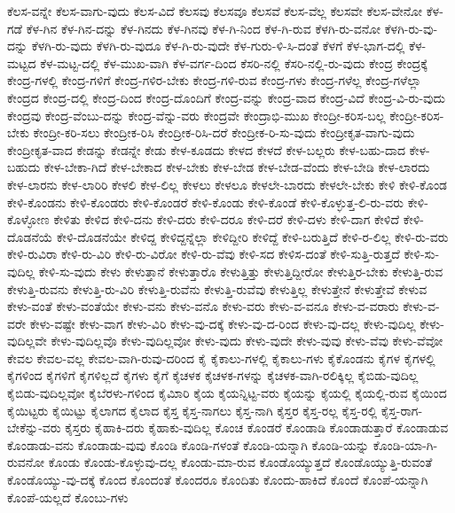 {ಕೆಲಸ-ವನ್ನೇ
ಕೆಲಸ-ವಾಗು-ವುದು
ಕೆಲಸ-ವಿದೆ
ಕೆಲಸವು
ಕೆಲಸವೂ
ಕೆಲಸವೆ
ಕೆಲಸ-ವೆಲ್ಲ
ಕೆಲಸವೇ
ಕೆಲಸ-ವೇನೋ
ಕೆಳ-ಗಡೆ
ಕೆಳ-ಗಿನ
ಕೆಳ-ಗಿನ-ದನ್ನು
ಕೆಳ-ಗಿನದು
ಕೆಳ-ಗಿನವು
ಕೆಳ-ಗಿ-ನಿಂದ
ಕೆಳ-ಗಿ-ರುವ
ಕೆಳಗಿ-ರು-ವನೋ
ಕೆಳಗಿ-ರು-ವು-ದನ್ನು
ಕೆಳಗಿ-ರು-ವುದು
ಕೆಳಗಿ-ರು-ವುದೂ
ಕೆಳ-ಗಿ-ರು-ವುದೇ
ಕೆಳ-ಗುರು-ಳಿ-ಸಿ-ದಂತೆ
ಕೆಳಗೆ
ಕೆಳ-ಭಾಗ-ದಲ್ಲಿ
ಕೆಳ-ಮಟ್ಟದ
ಕೆಳ-ಮಟ್ಟ-ದಲ್ಲಿ
ಕೆಳ-ಮುಖ-ವಾಗಿ
ಕೆಳ-ವರ್ಗ-ದಿಂದ
ಕೆಸರಿ-ನಲ್ಲಿ
ಕೆಸರಿ-ನಲ್ಲಿ-ರು-ವುದು
ಕೇಂದ್ರ
ಕೇಂದ್ರಕ್ಕೆ
ಕೇಂದ್ರ-ಗಳಲ್ಲಿ
ಕೇಂದ್ರ-ಗಳಿಗೆ
ಕೇಂದ್ರ-ಗಳಿರ-ಬೇಕು
ಕೇಂದ್ರ-ಗಳಿ-ರುವ
ಕೇಂದ್ರ-ಗಳು
ಕೇಂದ್ರ-ಗಳೆಲ್ಲ
ಕೇಂದ್ರ-ಗಳೆಲ್ಲಾ
ಕೇಂದ್ರದ
ಕೇಂದ್ರ-ದಲ್ಲಿ
ಕೇಂದ್ರ-ದಿಂದ
ಕೇಂದ್ರ-ದೊಂದಿಗೆ
ಕೇಂದ್ರ-ವನ್ನು
ಕೇಂದ್ರ-ವಾದ
ಕೇಂದ್ರ-ವಿದೆ
ಕೇಂದ್ರ-ವಿ-ರು-ವುದು
ಕೇಂದ್ರವು
ಕೇಂದ್ರ-ವೆಂಬು-ದನ್ನು
ಕೇಂದ್ರ-ವೆನ್ನು-ವರು
ಕೇಂದ್ರವೇ
ಕೇಂದ್ರಾಭಿ-ಮುಖ
ಕೇಂದ್ರೀ-ಕರಿಸ-ಬಲ್ಲ
ಕೇಂದ್ರೀ-ಕರಿಸ-ಬೇಕು
ಕೇಂದ್ರೀ-ಕರಿ-ಸಲು
ಕೇಂದ್ರೀಕ-ರಿಸಿ
ಕೇಂದ್ರೀಕ-ರಿಸಿ-ದರೆ
ಕೇಂದ್ರೀಕ-ರಿ-ಸು-ವುದು
ಕೇಂದ್ರೀಕೃತ-ವಾಗು-ವುದು
ಕೇಂದ್ರೀಕೃತ-ವಾದ
ಕೇಡನ್ನು
ಕೇಡನ್ನೇ
ಕೇಡು
ಕೇಳ-ಕೂಡದು
ಕೇಳದ
ಕೇಳದೆ
ಕೇಳ-ಬಲ್ಲರು
ಕೇಳ-ಬಹು-ದಾದ
ಕೇಳ-ಬಹುದು
ಕೇಳ-ಬೇಕಾ-ಗಿದೆ
ಕೇಳ-ಬೇಕಾದ
ಕೇಳ-ಬೇಕು
ಕೇಳ-ಬೇಡ
ಕೇಳ-ಬೇಡ-ವೆಂದು
ಕೇಳ-ಬೇಡಿ
ಕೇಳ-ಲಾರದು
ಕೇಳ-ಲಾರನು
ಕೇಳ-ಲಾರಿರಿ
ಕೇಳಲಿ
ಕೇಳ-ಲಿಲ್ಲ
ಕೇಳಲು
ಕೇಳಲೂ
ಕೇಳಲೇ-ಬಾರದು
ಕೇಳಲೇ-ಬೇಕು
ಕೇಳಿ
ಕೇಳಿ-ಕೊಂಡ
ಕೇಳಿ-ಕೊಂಡನು
ಕೇಳಿ-ಕೊಂಡರು
ಕೇಳಿ-ಕೊಂಡರೆ
ಕೇಳಿ-ಕೊಂಡು
ಕೇಳಿ-ಕೊಂಡೆ
ಕೇಳಿ-ಕೊಳ್ಳುತ್ತ-ಲಿ-ರು-ವರು
ಕೇಳಿ-ಕೊಳ್ಳೋಣ
ಕೇಳಿತು
ಕೇಳಿದ
ಕೇಳಿ-ದನು
ಕೇಳಿ-ದರು
ಕೇಳಿ-ದರೂ
ಕೇಳಿ-ದರೆ
ಕೇಳಿ-ದಳು
ಕೇಳಿ-ದಾಗ
ಕೇಳಿದೆ
ಕೇಳಿ-ದೊಡನೆಯೆ
ಕೇಳಿ-ದೊಡನೆಯೇ
ಕೇಳಿದ್ದ
ಕೇಳಿದ್ದನ್ನೆಲ್ಲಾ
ಕೇಳಿದ್ದೀರಿ
ಕೇಳಿದ್ದೆ
ಕೇಳಿ-ಬರುತ್ತಿದೆ
ಕೇಳಿ-ರ-ಲಿಲ್ಲ
ಕೇಳಿ-ರು-ವರು
ಕೇಳಿ-ರುವಿರಾ
ಕೇಳಿ-ರು-ವಿರಿ
ಕೇಳಿ-ರು-ವಿರೋ
ಕೇಳಿ-ರು-ವೆವು
ಕೇಳಿ-ಸದ
ಕೇಳಿಸ-ದಂತೆ
ಕೇಳಿ-ಸುತ್ತಿ-ರುತ್ತದೆ
ಕೇಳಿ-ಸು-ವುದಿಲ್ಲ
ಕೇಳಿ-ಸು-ವುದು
ಕೇಳು
ಕೇಳುತ್ತಾನೆ
ಕೇಳುತ್ತಾರೊ
ಕೇಳುತ್ತಿತ್ತು
ಕೇಳುತ್ತಿದ್ದೀರೋ
ಕೇಳುತ್ತಿರ-ಬೇಕು
ಕೇಳುತ್ತಿ-ರುವ
ಕೇಳುತ್ತಿ-ರುವನು
ಕೇಳುತ್ತಿ-ರು-ವಿರಿ
ಕೇಳುತ್ತಿ-ರುವೆನು
ಕೇಳುತ್ತಿ-ರುವೆವು
ಕೇಳುತ್ತಿಲ್ಲ
ಕೇಳುತ್ತೇನೆ
ಕೇಳುತ್ತೇವೆ
ಕೇಳುವ
ಕೇಳು-ವಂತೆ
ಕೇಳು-ವಂತೆಯೇ
ಕೇಳು-ವನು
ಕೇಳು-ವನೊ
ಕೇಳು-ವರು
ಕೇಳು-ವ-ವನೂ
ಕೇಳು-ವ-ವರಾರು
ಕೇಳು-ವ-ವರೇ
ಕೇಳು-ವಷ್ಟೇ
ಕೇಳು-ವಾಗ
ಕೇಳು-ವಿರಿ
ಕೇಳು-ವು-ದಕ್ಕೆ
ಕೇಳು-ವು-ದ-ರಿಂದ
ಕೇಳು-ವು-ದಲ್ಲ
ಕೇಳು-ವುದಿಲ್ಲ
ಕೇಳು-ವುದಿಲ್ಲವೇ
ಕೇಳು-ವುದಿಲ್ಲವೊ
ಕೇಳು-ವುದಿಲ್ಲವೋ
ಕೇಳು-ವುದು
ಕೇಳು-ವುದೇ
ಕೇಳು-ವುವು
ಕೇಳು-ವೆವು
ಕೇಳು-ವೆವೋ
ಕೇವಲ
ಕೇವಲ-ವಲ್ಲ
ಕೇವಲ-ವಾಗಿ-ರುವು-ದರಿಂದ
ಕೈ
ಕೈಕಾಲು-ಗಳಲ್ಲಿ
ಕೈಕಾಲು-ಗಳು
ಕೈಕೊಂಡನು
ಕೈಗಳ
ಕೈಗಳಲ್ಲಿ
ಕೈಗಳಿಂದ
ಕೈಗಳಿಗೆ
ಕೈಗಳಿಲ್ಲದೆ
ಕೈಗಳು
ಕೈಗೆ
ಕೈಚಳಕ
ಕೈಚಳಕ-ಗಳನ್ನು
ಕೈಚಳಕ-ವಾಗಿ-ರಲಿಕ್ಕಿಲ್ಲ
ಕೈಬಿಡು-ವುದಿಲ್ಲ
ಕೈಬಿಡು-ವುದಿಲ್ಲವೋ
ಕೈಬೆರಳು-ಗಳಿಂದ
ಕೈಮಿಾರಿ
ಕೈಯ
ಕೈಯನ್ನಿಟ್ಟ-ವರು
ಕೈಯನ್ನು
ಕೈಯಲ್ಲಿ
ಕೈಯಲ್ಲಿ-ರುವ
ಕೈಯಿಂದ
ಕೈಯಿಟ್ಟರು
ಕೈಯಿಟ್ಟು
ಕೈಲಾಗದ
ಕೈಲಾದ
ಕೈಸ್ತ
ಕೈಸ್ತ-ನಾಗಲು
ಕೈಸ್ತ-ನಾಗಿ
ಕೈಸ್ತರ
ಕೈಸ್ತ-ರಲ್ಲ
ಕೈಸ್ತ-ರಲ್ಲಿ
ಕೈಸ್ತ-ರಾಗ-ಬೇಕೆನ್ನು-ವರು
ಕೈಸ್ತರು
ಕೈಹಾಕಿ-ದರು
ಕೈಹಾಕು-ವುದಿಲ್ಲ
ಕೊಂಚ
ಕೊಂಡರೆ
ಕೊಂಡಾಡಿ
ಕೊಂಡಾಡುತ್ತಾರೆ
ಕೊಂಡಾಡುವ
ಕೊಂಡಾಡು-ವನು
ಕೊಂಡಾಡು-ವುವು
ಕೊಂಡಿ
ಕೊಂಡಿ-ಗಳಂತೆ
ಕೊಂಡಿ-ಯನ್ನಾಗಿ
ಕೊಂಡಿ-ಯನ್ನು
ಕೊಂಡಿ-ಯಾ-ಗಿ-ರುವನೋ
ಕೊಂಡು
ಕೊಂಡು-ಕೊಳ್ಳುವು-ದಲ್ಲ
ಕೊಂಡು-ಮಾ-ರುವ
ಕೊಂಡೊಯ್ಯುತ್ತದೆ
ಕೊಂಡೊಯ್ಯುತ್ತಿ-ರುವಂತೆ
ಕೊಂಡೊಯ್ಯು-ವು-ದಕ್ಕೆ
ಕೊಂದ
ಕೊಂದಂತೆ
ಕೊಂದರೂ
ಕೊಂದಿತು
ಕೊಂದು-ಹಾಕಿದೆ
ಕೊಂದೆ
ಕೊಂಪೆ-ಯನ್ನಾಗಿ
ಕೊಂಪೆ-ಯಲ್ಲದೆ
ಕೊಂಬು-ಗಳು
}
